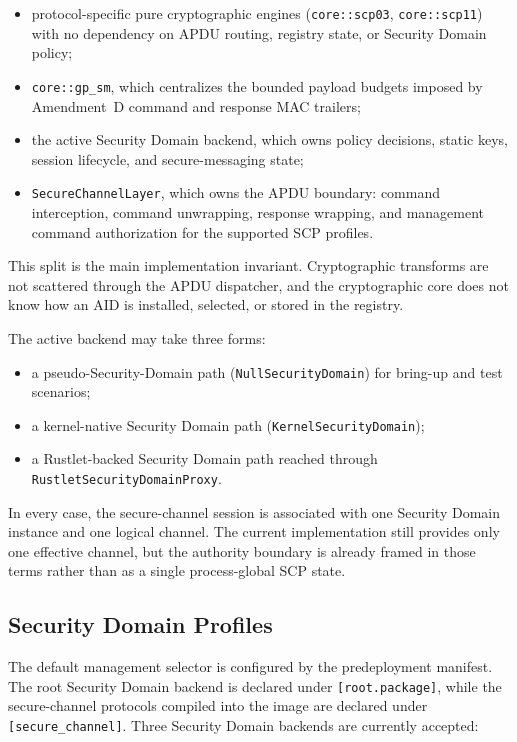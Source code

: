 \begin{itemize}
\item protocol-specific pure cryptographic engines
      (\texttt{core::scp03}, \texttt{core::scp11}) with no dependency on APDU
      routing, registry state, or Security Domain policy;
\item \texttt{core::gp\_sm}, which centralizes the bounded payload budgets
      imposed by Amendment~D command and response MAC trailers;
\item the active Security Domain backend, which owns policy decisions, static
      keys, session lifecycle, and secure-messaging state;
\item \texttt{SecureChannelLayer}, which owns the APDU boundary: command
      interception, command unwrapping, response wrapping, and management
      command authorization for the supported SCP profiles.
\end{itemize}

This split is the main implementation invariant. Cryptographic transforms are
not scattered through the APDU dispatcher, and the cryptographic core does not
know how an AID is installed, selected, or stored in the registry.

The active backend may take three forms:
\begin{itemize}
\item a pseudo-Security-Domain path (\texttt{NullSecurityDomain}) for bring-up
      and test scenarios;
\item a kernel-native Security Domain path (\texttt{KernelSecurityDomain});
\item a Rustlet-backed Security Domain path reached through
      \texttt{RustletSecurityDomainProxy}.
\end{itemize}

In every case, the secure-channel session is associated with one Security
Domain instance and one logical channel. The current implementation still
provides only one effective channel, but the authority boundary is already
framed in those terms rather than as a single process-global SCP state.

\subsection{Security Domain Profiles}
\label{sec:impl-sd-profiles}
\label{sec:impl-scp-profiles}

The default management selector is configured by the predeployment manifest.
The root Security Domain backend is declared under \texttt{[root.package]},
while the secure-channel protocols compiled into the image are declared under
\texttt{[secure\_channel]}. Three Security Domain backends are currently
accepted:

